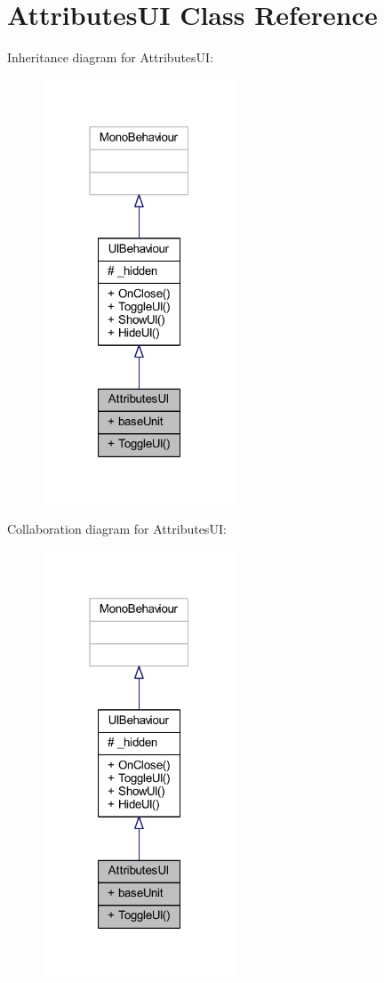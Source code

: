 \hypertarget{class_attributes_u_i}{}\section{Attributes\+UI Class Reference}
\label{class_attributes_u_i}


Inheritance diagram for Attributes\+UI\+:\nopagebreak
\begin{figure}[H]
\begin{center}
\leavevmode
\includegraphics[width=163pt]{class_attributes_u_i__inherit__graph}
\end{center}
\end{figure}


Collaboration diagram for Attributes\+UI\+:\nopagebreak
\begin{figure}[H]
\begin{center}
\leavevmode
\includegraphics[width=163pt]{class_attributes_u_i__coll__graph}
\end{center}
\end{figure}
